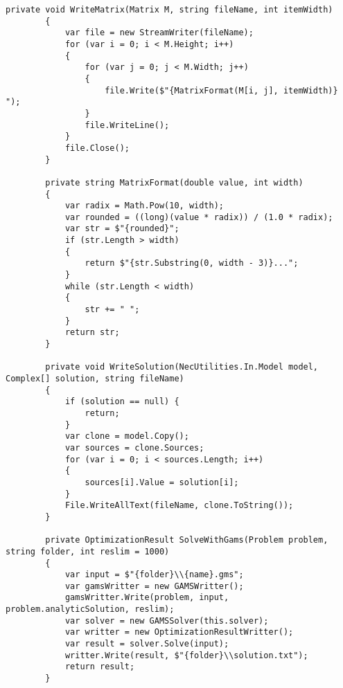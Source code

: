 \documentclass{scrartcl}
\begin{document}
\begin{lstlisting}[language={[Sharp]C}, caption={Experiment}, label={experiment}]
        private void WriteMatrix(Matrix M, string fileName, int itemWidth)
        {
            var file = new StreamWriter(fileName);
            for (var i = 0; i < M.Height; i++)
            {
                for (var j = 0; j < M.Width; j++)
                {
                    file.Write($"{MatrixFormat(M[i, j], itemWidth)} ");
                }
                file.WriteLine();
            }
            file.Close();
        }

        private string MatrixFormat(double value, int width)
        {
            var radix = Math.Pow(10, width);
            var rounded = ((long)(value * radix)) / (1.0 * radix);
            var str = $"{rounded}";
            if (str.Length > width)
            {
                return $"{str.Substring(0, width - 3)}...";
            }
            while (str.Length < width)
            {
                str += " ";
            }
            return str;
        }

        private void WriteSolution(NecUtilities.In.Model model, Complex[] solution, string fileName)
        {
            if (solution == null) {
                return;
            }
            var clone = model.Copy();
            var sources = clone.Sources;
            for (var i = 0; i < sources.Length; i++)
            {
                sources[i].Value = solution[i];
            }
            File.WriteAllText(fileName, clone.ToString());
        }

        private OptimizationResult SolveWithGams(Problem problem, string folder, int reslim = 1000)
        {
            var input = $"{folder}\\{name}.gms";
            var gamsWritter = new GAMSWritter();
            gamsWritter.Write(problem, input, problem.analyticSolution, reslim);
            var solver = new GAMSSolver(this.solver);
            var writter = new OptimizationResultWritter();
            var result = solver.Solve(input);
            writter.Write(result, $"{folder}\\solution.txt");
            return result;
        }


\end{lstlisting}
\end{document}
